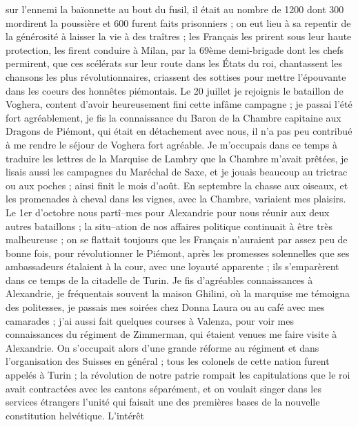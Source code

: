 \documentclass[12pt]{article}
\begin{document}
 sur l’ennemi la baïonnette au bout du fusil, il était au
nombre de 1200 dont 300 mordirent la poussière et 600 furent faits prisonniers ; on eut lieu à sa
repentir de la générosité à laisser la vie à des traîtres ; les Français les prirent sous leur haute
protection, les firent conduire à Milan, par la 69ème demi-brigade dont les chefs permirent, que ces
scélérats sur leur route dans les États du roi, chantassent les chansons les plus révolutionnaires,
criassent des sottises pour mettre l’épouvante dans les coeurs des honnêtes piémontais. Le 20
juillet je rejoignis le bataillon de Voghera, content d’avoir heureusement fini cette infâme
campagne ; je passai l’été fort agréablement, je fis la connaissance du Baron de la Chambre
capitaine aux Dragons de Piémont, qui était en détachement avec nous, il n’a pas peu contribué à me
rendre le séjour de Voghera fort agréable. Je m’occupais dans ce temps à traduire les lettres de la
Marquise de Lambry que la Chambre m’avait prêtées, je lisais aussi les campagnes du Maréchal de
Saxe, et je jouais beaucoup au trictrac ou aux poches ; ainsi finit le mois d’août. En septembre la
chasse aux oiseaux, et les promenades à cheval dans les vignes, avec la Chambre, variaient mes
plaisirs. Le 1er d’octobre nous partî–mes pour Alexandrie pour nous réunir aux deux autres
bataillons ; la situ–ation de nos affaires politique continuait à être très malheureuse ; on se
flattait toujours que les Français n’auraient par assez peu de bonne fois, pour révolutionner le
Piémont, après les promesses solennelles que ses ambassadeurs étalaient à la cour, avec une loyauté
apparente ; ils s’emparèrent dans ce temps de la citadelle de Turin. Je fis d’agréables
connaissances à Alexandrie, je fréquentais souvent la maison Ghilini, où la marquise me témoigna des
politesses, je passais mes soirées chez Donna Laura ou au café avec mes camarades ; j’ai aussi fait
quelques courses à Valenza, pour voir mes connaissances du régiment de Zimmerman, qui étaient venues
me faire visite à Alexandrie. On s’occupait alors d’une grande réforme au régiment et dans
l’organisation des Suisses en général ; tous les colonels de cette nation furent appelés à Turin ;
la révolution de notre patrie rompait les capitulations que le roi avait contractées avec les
cantons séparément, et on voulait singer dans les services étrangers l’unité qui faisait une des
premières bases de la nouvelle constitution helvétique. L’intérêt
\end{document}
